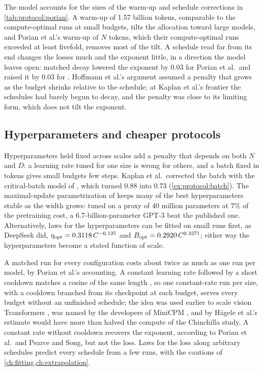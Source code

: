 \begin{refsection}
The model accounts for the sizes of the warm-up and schedule corrections in \cref{tab:protocol:porian}. A warm-up of 1.57 billion tokens, comparable to the compute-optimal runs at small budgets, tilts the allocation toward large models, and Porian et al.'s warm-up of $N$ tokens, which their compute-optimal runs exceeded at least fivefold, removes most of the tilt. A schedule read far from its end changes the losses much and the exponent little, in a direction the model leaves open: matched decay lowered the exponent by $0.03$ for Porian et al.\ and raised it by $0.03$ for \textcite{PearceSong2024}. Hoffmann et al.'s argument assumed a penalty that grows as the budget shrinks relative to the schedule; at Kaplan et al.'s frontier the schedules had barely begun to decay, and the penalty was close to its limiting form, which does not tilt the exponent.

\subsection*{Hyperparameters and cheaper protocols}

Hyperparameters held fixed across scales add a penalty that depends on both $N$ and $D$: a learning rate tuned for one size is wrong for others, and a batch fixed in tokens gives small budgets few steps. Kaplan et al.\ corrected the batch with the critical-batch model of \textcite{McCandlishEtAl2018}, which turned $0.88$ into $0.73$ (\cref{ex:protocol:batch}). The maximal-update parametrization of \textcite{YangEtAl2021} keeps many of the best hyperparameters stable as the width grows: tuned on a proxy of 40 million parameters at $7\%$ of the pretraining cost, a 6.7-billion-parameter GPT-3 beat the published one. Alternatively, laws for the hyperparameters can be fitted on small runs first, as DeepSeek did, $\eta_{\mathrm{opt}}=0.3118\,C^{-0.125}$ and $B_{\mathrm{opt}}=0.2920\,C^{0.3271}$; either way the hyperparameters become a stated function of scale.

A matched run for every configuration costs about twice as much as one run per model, by Porian et al.'s accounting. A constant learning rate followed by a short cooldown matches a cosine of the same length \parencite{HageleEtAl2024}, so one constant-rate run per size, with a cooldown branched from its checkpoint at each budget, serves every budget without an unfinished schedule; the idea was used earlier to scale vision Transformers \parencite{ZhaiEtAl2022}, was named  by the developers of MiniCPM \parencite{HuEtAl2024}, and by Hägele et al.'s estimate would have more than halved the compute of the Chinchilla study. A constant rate without cooldown recovers the exponent, according to Porian et al.\ and Pearce and Song, but not the loss. Laws for the loss along arbitrary schedules \parencite{TissueEtAl2025} predict every schedule from a few runs, with the cautions of \cref{ch:fitting,ch:extrapolation}.


\end{refsection}
